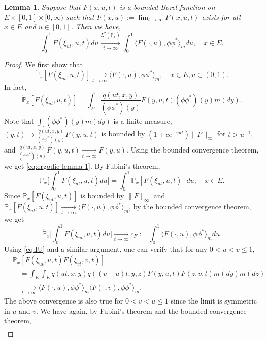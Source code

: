 \documentclass[UTF8]{pkuthss}
\theoremstyle{plain}
\newtheorem{lem}[thm]{Lemma}
\theoremstyle{definition}
\numberwithin{equation}{section}
\begin{document}
\begin{lem}
\label{lem:ergodic}
	Suppose that $F(x,u,t)$ is a bounded Borel function on $E\times [0,1]\times [0,\infty)$ such that $F(x,u):= \lim_{t\to\infty} F(x,u,t)$ exists for all $x\in E$ and $u\in [0,1]$.
	Then we have,
\[
	\int_0^1 F(\xi_{ut},u,t)du
	\xrightarrow[t\to\infty]{L^2(\dot{\mathbb P}_x)} \int_0^1 \langle F(\cdot ,u),\phi\phi^* \rangle_m du,
	\quad x\in E.
\]
\end{lem}
\begin{proof}
\par
	We first show that
\begin{equation}\label{eq:ergodic-lemma-1}
	\dot{\mathbb P}_x[F(\xi_{ut},u,t)]
	\xrightarrow[t\to\infty]{} \langle F(\cdot,u),\phi\phi^*\rangle_m,
      \quad x\in E, u\in(0,1).
\end{equation}
	In fact,
\[
	\dot{\mathbb P}_x[F(\xi_{ut},u,t)]
	=\int_E \frac{\dot{q}(ut,x,y)}{(\phi\phi^*)(y)}F(y,u,t)(\phi\phi^*)(y)m(dy).
\]
	Note that $\int_\cdot (\phi\phi^*)(y)m(dy)$ is a finite measure, $(y,t)\mapsto \frac{\dot{q}(ut,x,y)}{(\phi\phi^*)(y)}F(y,u,t)$ is bounded by $(1+ce^{-\gamma ut})\|F\|_\infty$ for $t>u^{-1}$, and $\frac{\dot{q}(ut,x,y)}{(\phi\phi^*)(y)}F(y,u,t)\xrightarrow[t\to\infty]{}F(y,u)$.
	Using the bounded convergence theorem, we get \eqref{eq:ergodic-lemma-1}.
	By Fubini's theorem,
\[
	\dot{\mathbb P}_x\big[\int_0^1F(\xi_{ut},u,t)du\big]
	=\int_0^1\dot{\mathbb P}_x[F(\xi_{ut},u,t)]du,
	\quad x\in E.
\]
	Since $\dot{\mathbb P}_x[F(\xi_{ut},u,t)]$ is bounded by $\|F\|_\infty$ and $\dot{\mathbb P}_x[F(\xi_{ut},u,t)]\xrightarrow[t\to\infty]{}\langle F(\cdot, u),\phi\phi^*\rangle_m$, by the bounded convergence theorem, we get
\[
	\dot{\mathbb P}_x\big[\int_0^1F(\xi_{ut},u,t)du\big]
	\xrightarrow[t\to\infty]{} c_F
	:=\int_0^1\langle F(\cdot,u),\phi\phi^*\rangle_mdu.
\]
Using \eqref{eq:IU} and a similar argument,
	one can verify that for any $0< u< v\leq 1$,
\[\begin{split}
	&\dot{\mathbb P}_x[F(\xi_{ut},u,t)F(\xi_{vt},v,t)]\\
	&\quad=\int_E\int_E  \dot{q}(ut,x,y) \dot{q}((v-u)t,y,z)F(y,u,t)F(z,v,t)m(dy)m(dz)\\
	&\quad\xrightarrow[t\to\infty]{} \langle F(\cdot,u),\phi\phi^*\rangle_m \langle F(\cdot,v),\phi\phi^*\rangle_m.
\end{split}\]
	The above convergence is also true for $0< v < u\leq 1$ since the limit is symmetric in $u$ and $v$.
	We have again, by Fubini's theorem and the bounded convergence theorem,
\[\begin{split}

\end{split}\]
\end{proof}
\end{document}
